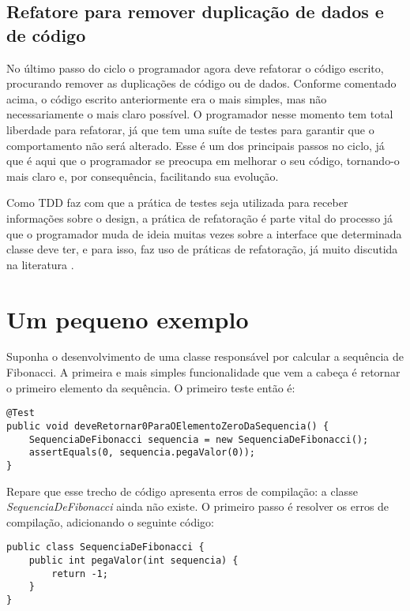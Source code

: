 \subsection{Refatore para remover duplicação de dados e de código}

No último passo do ciclo o programador agora deve refatorar o código escrito, procurando remover as duplicações de código ou de dados. 
Conforme comentado acima, o código escrito anteriormente era o mais simples, mas não necessariamente o mais claro possível. O programador
nesse momento tem total liberdade para refatorar, já que tem uma suíte de testes para garantir que o comportamento não será alterado.
Esse é um dos principais passos no ciclo, já que é aqui que o programador se preocupa em melhorar o seu código, tornando-o
mais claro e, por consequência, facilitando sua evolução.

Como TDD faz com que a prática de testes seja utilizada para receber informações sobre o design, 
a prática de refatoração é parte vital do processo já que o programador muda de ideia muitas vezes sobre a interface que determinada
classe deve ter, e para isso, faz uso de práticas de refatoração, já muito discutida na literatura \cite{fowler-refactoring} \cite{joshua-refactoring}.

\section{Um pequeno exemplo}
\label{sec:tdd-exemplo}

Suponha o desenvolvimento de uma classe responsável por calcular a sequência de Fibonacci. A primeira e mais simples funcionalidade que
vem a cabeça é retornar o primeiro elemento da sequência. O primeiro teste então é:

\begin{lstlisting}[frame=trbl]
@Test
public void deveRetornar0ParaOElementoZeroDaSequencia() {
	SequenciaDeFibonacci sequencia = new SequenciaDeFibonacci();
	assertEquals(0, sequencia.pegaValor(0));
}
\end{lstlisting}

Repare que esse trecho de código apresenta erros de compilação: a classe \textit{SequenciaDeFibonacci} ainda não existe. O primeiro
passo é resolver os erros de compilação, adicionando o seguinte código:

\begin{lstlisting}[frame=trbl]
public class SequenciaDeFibonacci {
	public int pegaValor(int sequencia) {
		return -1;
	}
}
\end{lstlisting}

